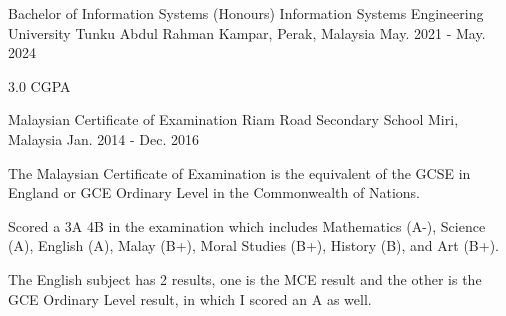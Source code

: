 

\begin{cventries}

  \cventry
    {Bachelor of Information Systems (Honours) Information Systems Engineering} %
    {University Tunku Abdul Rahman} %
    {Kampar, Perak, Malaysia} %
    {May. 2021 - May. 2024} %
    {
      \begin{cvitems} %
        \item {3.0 CGPA}
      \end{cvitems}
    }
  \cventry
    {Malaysian Certificate of Examination} %
    {Riam Road Secondary School} %
    {Miri, Malaysia} %
    {Jan. 2014 - Dec. 2016} %
    {
      \begin{cvitems} %
        \item {The Malaysian Certificate of Examination is the equivalent of the GCSE in England or GCE Ordinary Level in the Commonwealth of Nations.}
        \item {Scored a 3A 4B in the examination which includes Mathematics (A-), Science (A), English (A), Malay (B+), Moral Studies (B+), History (B), and Art (B+).}
        \item {The English subject has 2 results, one is the MCE result and the other is the GCE Ordinary Level result, in which I scored an A as well.}
      \end{cvitems}
    }
\end{cventries}
